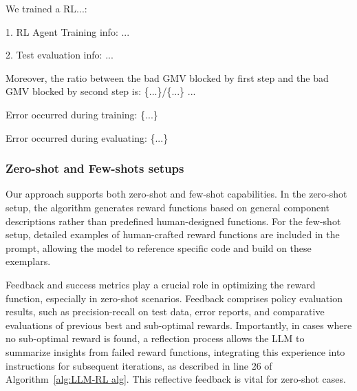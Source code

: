 \documentclass[11pt]{article}
\begin{document}
\begin{tcolorbox}[title=Feedback Prompts, colframe=gray, colback=white, breakable,fonttitle=\large\bfseries, fontupper=\small]
We trained a RL...:

1. RL Agent Training info: ...

2. Test evaluation info: ...

Moreover, the ratio between the bad GMV blocked by first step and the bad GMV blocked by second step is: \{...\}/\{...\} ...

Error occurred during training: \{...\}

Error occurred during evaluating: \{...\}
\end{tcolorbox}

\subsubsection{Zero-shot and Few-shots setups}

Our approach supports both zero-shot and few-shot capabilities. In the zero-shot setup, the algorithm generates reward functions based on general component descriptions rather than predefined human-designed functions. For the few-shot setup, detailed examples of human-crafted reward functions are included in the prompt, allowing the model to reference specific code and build on these exemplars.

Feedback and success metrics play a crucial role in optimizing the reward function, especially in zero-shot scenarios. Feedback comprises policy evaluation results, such as precision-recall on test data, error reports, and comparative evaluations of previous best and sub-optimal rewards. Importantly, in cases where no sub-optimal reward is found, a reflection process allows the LLM to summarize insights from failed reward functions, integrating this experience into instructions for subsequent iterations, as described in line 26 of Algorithm~\ref{alg:LLM-RL alg}. This reflective feedback is vital for zero-shot cases.
\end{document}
